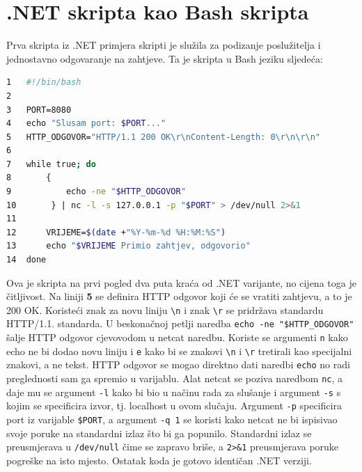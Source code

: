 \documentclass{foi}
\begin{document}
\section{.NET skripta kao Bash skripta}
Prva skripta iz .NET primjera skripti je služila za podizanje poslužitelja i jednostavno odgovaranje na zahtjeve. Ta je skripta u Bash jeziku sljedeća:
\begin{lstlisting}[language=bash]
1   #!/bin/bash
2
3   PORT=8080
4   echo "Slusam port: $PORT..."
5   HTTP_ODGOVOR="HTTP/1.1 200 OK\r\nContent-Length: 0\r\n\r\n"
6
7   while true; do
8       {
9           echo -ne "$HTTP_ODGOVOR"
10       } | nc -l -s 127.0.0.1 -p "$PORT" > /dev/null 2>&1
11
12      VRIJEME=$(date +"%Y-%m-%d %H:%M:%S")
13      echo "$VRIJEME Primio zahtjev, odgovorio"
14  done

\end{lstlisting}
Ova je skripta na prvi pogled dva puta kraća od .NET varijante, no cijena toga je čitljivost. Na liniji \textbf{5} se definira HTTP odgovor koji će se vratiti zahtjevu, a to je 200 OK. Koristeći znak za novu liniju \verb|\n| i znak \verb|\r| se pridržava standardu HTTP/1.1. standarda. U beskonačnoj petlji naredba \verb|echo -ne "$HTTP_ODGOVOR"| šalje HTTP odgovor cjevovodom u netcat naredbu. Koriste se argumenti \verb|n| kako echo ne bi dodao novu liniju i \verb|e| kako bi se znakovi \verb|\n| i \verb|\r| tretirali kao specijalni znakovi, a ne tekst. HTTP odgovor se mogao direktno dati naredbi \verb|echo| no radi preglednosti sam ga spremio u varijablu. Alat netcat se poziva naredbom \verb|nc|, a daje mu se argument \verb|-l| kako bi bio u načinu rada za slušanje i argument \verb|-s| s kojim se specificira izvor, tj. localhost u ovom slučaju. Argument \verb|-p| specificira port iz varijable \verb|$PORT|, a argument \verb|-q 1| se koristi kako netcat ne bi ispisivao svoje poruke na standardni izlaz što bi ga popunilo. Standardni izlaz se preusmjerava u \verb|/dev/null| čime se zapravo briše, a \verb|2>&1| preusmjerava poruke pogreške na isto mjesto. Ostatak koda je gotovo identičan .NET verziji.
\end{document}
